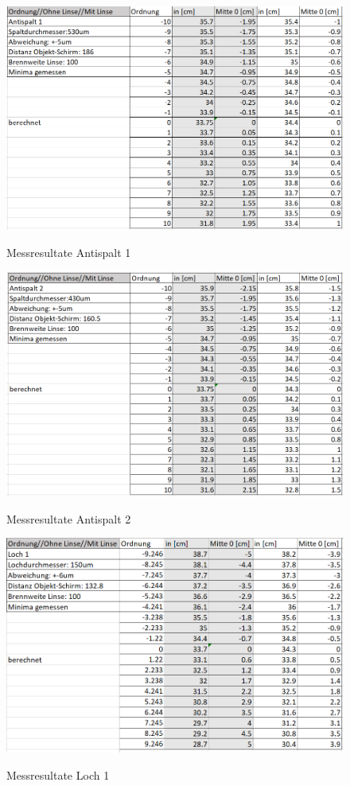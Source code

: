 \begin{figure}[h]
\centering
\includegraphics[width=\textwidth]{Bilder/messung3.png} 
\label{fig:messresultate3}
\caption{Messresultate Antispalt 1}
\end{figure}
\newpage

\begin{figure}[h]
\centering
\includegraphics[width=\textwidth]{Bilder/messung4.png} 
\label{fig:messresultate4}
\caption{Messresultate Antispalt 2}
\end{figure}
\newpage

\begin{figure}[h]
\centering
\includegraphics[width=\textwidth]{Bilder/messung5.png} 
\label{fig:messresultate5}
\caption{Messresultate Loch 1}
\end{figure}
\newpage

